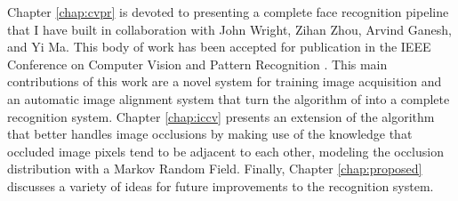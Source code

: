 Chapter \ref{chap:cvpr} is devoted to presenting a complete face recognition pipeline that I have built in collaboration with John Wright, Zihan Zhou, Arvind Ganesh, and Yi Ma.  This body of work has been accepted for publication in the IEEE Conference on Computer Vision and Pattern Recognition \cite{Wagner2009-CVPR}.  This main contributions of this work are a novel system for training image acquisition and an automatic image alignment system that turn the algorithm of \cite{Wright2009-PAMI} into a complete recognition system.  Chapter \ref{chap:iccv} presents an extension of the algorithm that better handles image occlusions by making use of the knowledge that occluded image pixels tend to be adjacent to each other, modeling the occlusion distribution with a Markov Random Field.  Finally, Chapter \ref{chap:proposed} discusses a variety of ideas for future improvements to the recognition system.




